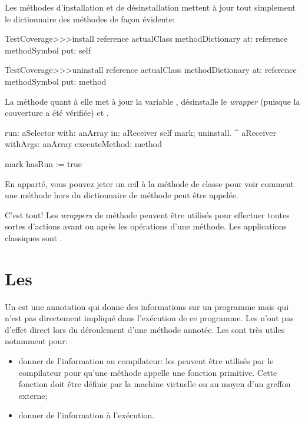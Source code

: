\documentclass[a4paper,10pt,twoside]{book}
\begin{document}
Les méthodes d'installation et de désinstallation mettent à jour tout simplement le dictionnaire des méthodes de façon évidente:
\begin{code}{}
TestCoverage>>>install
	reference actualClass methodDictionary
		at: reference methodSymbol
		put: self

TestCoverage>>>uninstall
	reference actualClass methodDictionary
		at: reference methodSymbol
		put: method
\end{code}
\noindent
La méthode  quant à elle met à jour la variable , désinstalle le \emph{wrapper} (puisque la couverture a été vérifiée) et . %
\begin{code}{}
run: aSelector with: anArray in: aReceiver
	self mark; uninstall.
	^ aReceiver withArgs: anArray executeMethod: method

mark
	hasRun := true
\end{code}
En apparté, vous pouvez jeter un \oe il à la méthode de classe
 pour voir comment
une méthode hors du dictionnaire de méthode peut être appelée.

C'est tout!
Les \emph{wrappers} de méthode peuvent être utilisés pour effectuer toutes sortes d'actions avant ou après les opérations d'une méthode.  Les applications classiques sont .

\section{Les \pragmas}

Un  est une annotation qui donne des informations sur un programme mais qui n'est pas directement impliqué dans l'exécution de ce programme. Les \pragmas n'ont pas d'effet direct lors du déroulement d'une méthode annotée.
Les \pragmas sont très utiles notamment pour:
\begin{itemize}
\item donner de l'information au compilateur: les  peuvent être utilisés par le compilateur pour qu'une méthode appelle une fonction primitive. Cette fonction doit être définie par la machine virtuelle ou au moyen d'un greffon externe;
\item donner de l'information à l'exécution.
\end{itemize}
\end{document}
